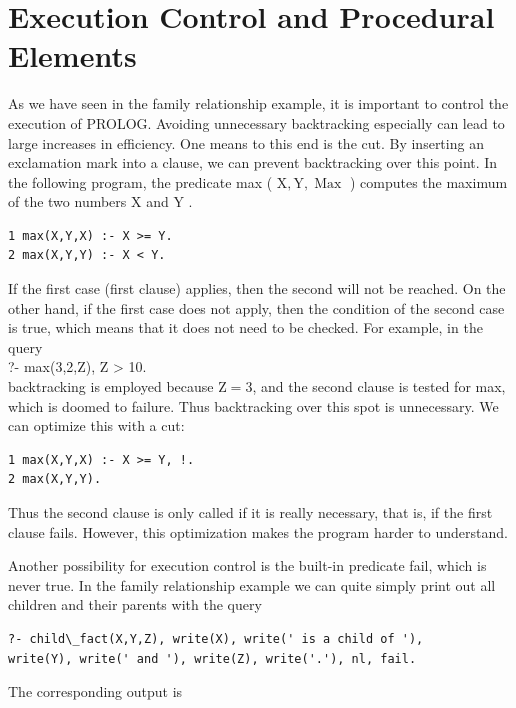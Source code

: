 \documentclass[10pt]{book}
\begin{document}
\section{Execution Control and Procedural Elements}
As we have seen in the family relationship example, it is important to control the execution of PROLOG. Avoiding unnecessary backtracking especially can lead to large increases in efficiency. One means to this end is the cut. By inserting an exclamation mark into a clause, we can prevent backtracking over this point. In the following program, the predicate max ( $\mathrm{X}, \mathrm{Y}, \operatorname{Max}$ ) computes the maximum of the two numbers X and Y .

\begin{verbatim}
1 max(X,Y,X) :- X >= Y.
2 max(X,Y,Y) :- X < Y.
\end{verbatim}

If the first case (first clause) applies, then the second will not be reached. On the other hand, if the first case does not apply, then the condition of the second case is true, which means that it does not need to be checked. For example, in the query\\
?- max(3,2,Z), Z > 10.\\
backtracking is employed because $\mathrm{Z}=3$, and the second clause is tested for max, which is doomed to failure. Thus backtracking over this spot is unnecessary. We can optimize this with a cut:


\begin{verbatim}
1 max(X,Y,X) :- X >= Y, !.
2 max(X,Y,Y).
\end{verbatim}

Thus the second clause is only called if it is really necessary, that is, if the first clause fails. However, this optimization makes the program harder to understand.

Another possibility for execution control is the built-in predicate fail, which is never true. In the family relationship example we can quite simply print out all children and their parents with the query

\begin{verbatim}
?- child\_fact(X,Y,Z), write(X), write(' is a child of '),
write(Y), write(' and '), write(Z), write('.'), nl, fail.
\end{verbatim}

The corresponding output is
\end{document}
